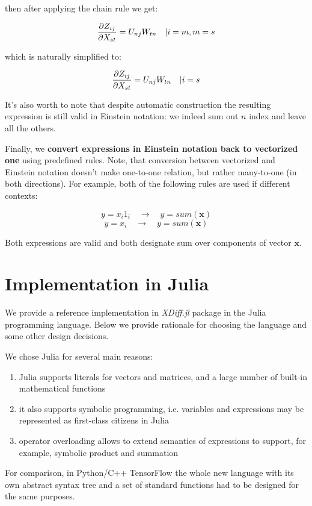 \documentclass[conference]{IEEEtran}
\begin{document}
then after applying the chain rule we get:

$$\pdv{Z_{ij}}{X_{st}} = U_{nj}W_{tn} \quad | i = m, m = s$$

which is naturally simplified to:

$$\pdv{Z_{ij}}{X_{st}} = U_{nj}W_{tn} \quad | i = s$$

It's also worth to note that despite automatic construction the
resulting expression is still valid in Einstein notation: we indeed
sum out $n$ index and leave all the others.

Finally, we \textbf{convert expressions in Einstein notation back to
  vectorized one} using predefined rules. Note, that conversion
between vectorized and Einstein notation doesn't make one-to-one
relation, but rather many-to-one (in both directions). For example,
both of the following rules are used if different contexts:

$$y = x_i1_i \quad \rightarrow \quad y = sum(\pmb{x})$$
$$y = x_i \quad \rightarrow \quad y = sum(\pmb{x})$$

Both expressions are valid and both designate sum over components of
vector $\pmb{x}$.

\section{Implementation in Julia}

We provide a reference implementation in \textit{XDiff.jl} \cite{XDiff} package
in the Julia programming language. Below we provide
rationale for choosing the language and some other design decisions.

We chose Julia for several main reasons:

\begin{enumerate}
\item Julia supports literals for vectors and matrices, and a large
  number of built-in mathematical functions
\item it also supports symbolic programming, i.e. variables and
  expressions may be represented as first-class citizens in Julia
\item operator overloading allows to extend semantics of expressions
  to support, for example, symbolic product and summation
\end{enumerate}

For comparison, in Python/C++ TensorFlow the whole new language with
its own abstract syntax tree and a set of standard functions had to be
designed for the same purposes.
\end{document}
